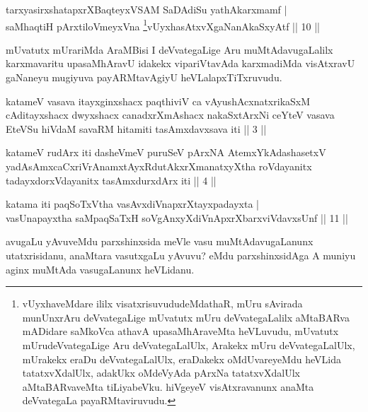 
\begin{shl}
tarxyasirxshatapxrXBaqteyxVSAM SaDAdiSu yathAkarxmamf |\\
saMhaqtiH pArxtiloVmeyxVna \footnote{vUyxhaveMdare ililx visatxrisuvududeMdathaR, mUru sAvirada munUnxrAru deVvategaLige mUvatutx mUru deVvategaLalilx aMtaBARva mADidare saMkoVca athavA upasaMhAraveMta heVLuvudu, mUvatutx mUrudeVvategaLige Aru deVvategaLalUlx, Arakekx mUru deVvategaLalUlx, mUrakekx eraDu deVvategaLalUlx, eraDakekx oMdUvareyeMdu heVLida tatatxvXdalUlx, adakUkx oMdeVyAda pArxNa tatatxvXdalUlx aMtaBARvaveMta tiLiyabeVku. hiVgeyeV visAtxravanunx anaMta deVvategaLa payaRMtaviruvudu.}vUyxhasAtxvXgaNanAkaSxyAtf \hfill || 10 ||
\end{shl}

\begin{artha}
mUvatutx mUrariMda AraMBisi I deVvategaLige Aru muMtAdavugaLalilx karxmavaritu upasaMhAravU idakekx vipariVtavAda karxmadiMda  visAtxravU gaNaneyu mugiyuva payARMtavAgiyU heVLalapxTiTxruvudu.
\end{artha}


\begin{kandikeshl}
katameV vasava itayxginxshacx paqthiviV ca vAyushAcxnatxrikaSxM cAditayxshacx dwyxshacx canadxrXmAshacx nakaSxtArxNi ceYteV vasava EteVSu hiVdaM savaRM hitamiti tasAmxdavxsava iti || 3 ||
\end{kandikeshl}

\begin{kandikeshl}
katameV rudArx iti dasheVmeV puruSeV pArxNA AtemxYkAdashasetxV yadAsAmxcaCxriVrAnamxtAyxRdutAkxrXmanatxyXtha roVdayanitx tadayxdorxVdayanitx tasAmxdurxdArx iti || 4 ||
\end{kandikeshl}

\begin{shl}
katama iti paqSoTxV\s tha vasAvxdiVnapxrXtayxpadayxta |\\
vasUnapayxtha saMpaqSaTxH soV\s gAnxyXdiVnApxrXbarxviVdavxsUnf \hfill || 11 ||
\end{shl}

\begin{artha}
avugaLu yAvuveMdu parxshinxsida meVle vasu muMtAdavugaLanunx utatxrisidanu, anaMtara vasutxgaLu yAvuvu? eMdu parxshinxsidAga A muniyu aginx muMtAda vasugaLanunx heVLidanu.
\end{artha}


